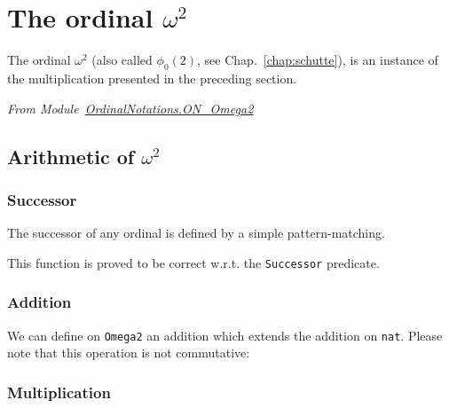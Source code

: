 

\section{The ordinal \texorpdfstring{$\omega^2$}{omega2}}

The ordinal $\omega^2$ (also called $\phi_0(2)$, see Chap.~\ref{chap:schutte}), is an instance of the multiplication presented in the preceding section.

\vspace{4pt}
\noindent\emph{From Module~\href{../theories/html/hydras.OrdinalNotations.ON_Omega2.html}{OrdinalNotations.ON\_Omega2}}





\subsection{Arithmetic of \texorpdfstring{$\omega^2$}{omega^2}} 

\subsubsection{Successor}

The successor of any ordinal is defined by a simple pattern-matching.




This function is proved to be correct w.r.t. the \texttt{Successor} predicate.






\subsubsection{Addition}

We can define on \texttt{Omega2} an addition which extends the addition on \texttt{nat}. Please note that this operation is not commutative:




\subsubsection{Multiplication}

